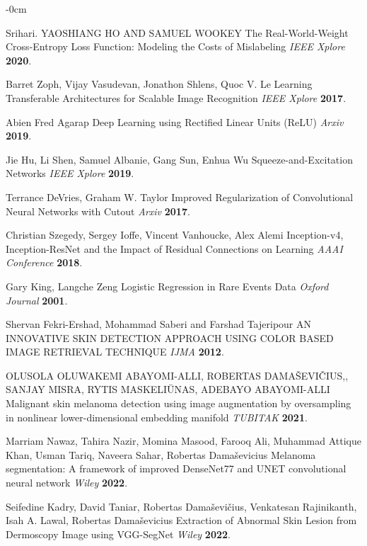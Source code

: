 \documentclass[sensors,article,submit,pdftex,moreauthors]{Definitions/mdpi}
\begin{document}
\begin{adjustwidth}{-\extralength}{0cm}
\begin{thebibliography}{999}
Srihari. YAOSHIANG HO AND SAMUEL WOOKEY The Real-World-Weight Cross-Entropy Loss Function: Modeling the Costs of Mislabeling 
{\em IEEE Xplore} 
{\bf 2020}.

Barret Zoph, Vijay Vasudevan, Jonathon Shlens, Quoc V. Le Learning Transferable Architectures for Scalable Image Recognition 
{\em IEEE Xplore} 
{\bf 2017}.

Abien Fred Agarap Deep Learning using Rectified Linear Units (ReLU) 
{\em Arxiv} 
{\bf 2019}.

Jie Hu, Li Shen, Samuel Albanie, Gang Sun, Enhua Wu Squeeze-and-Excitation Networks 
{\em IEEE Xplore} 
{\bf 2019}.

Terrance DeVries, Graham W. Taylor Improved Regularization of Convolutional Neural Networks with Cutout 
{\em Arxiv} 
{\bf 2017}.

Christian Szegedy, Sergey Ioffe, Vincent Vanhoucke, Alex Alemi Inception-v4, Inception-ResNet and the Impact of Residual Connections on Learning
{\em AAAI Conference} 
{\bf 2018}.

Gary King, Langche Zeng Logistic Regression in Rare Events Data
{\em Oxford Journal} 
{\bf 2001}.

Shervan Fekri-Ershad, Mohammad Saberi and Farshad Tajeripour AN INNOVATIVE SKIN DETECTION APPROACH
USING COLOR BASED IMAGE RETRIEVAL TECHNIQUE
{\em IJMA} 
{\bf 2012}.

OLUSOLA OLUWAKEMI ABAYOMI-ALLI, ROBERTAS DAMAŠEVIČIUS,,
SANJAY MISRA, RYTIS MASKELIŪNAS, ADEBAYO ABAYOMI-ALLI Malignant skin melanoma detection using image augmentation by oversampling in nonlinear lower-dimensional embedding manifold
{\em TUBITAK} 
{\bf 2021}.

Marriam Nawaz, Tahira Nazir, Momina Masood, Farooq Ali, 
Muhammad Attique Khan, Usman Tariq, Naveera Sahar,
Robertas Damaševicius Melanoma segmentation: A framework of improved
DenseNet77 and UNET convolutional neural network
{\em Wiley} 
{\bf 2022}.

Seifedine Kadry, David Taniar, Robertas Damaševičius, Venkatesan Rajinikanth, Isah A. Lawal,
Robertas Damaševicius Extraction of Abnormal Skin Lesion from
Dermoscopy Image using VGG-SegNet
{\em Wiley} 
{\bf 2022}.
\end{thebibliography}


\end{adjustwidth}
\end{document}
